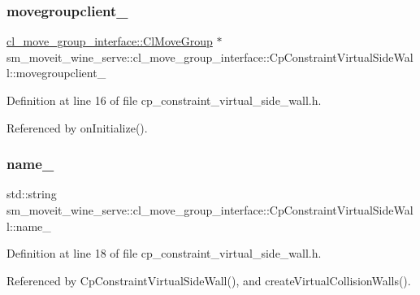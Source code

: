 \subsubsection{\texorpdfstring{movegroupclient\+\_\+}{movegroupclient\_}}
{\footnotesize\ttfamily \hyperlink{classcl__move__group__interface_1_1ClMoveGroup}{cl\+\_\+move\+\_\+group\+\_\+interface\+::\+Cl\+Move\+Group} $\ast$ sm\+\_\+moveit\+\_\+wine\+\_\+serve\+::cl\+\_\+move\+\_\+group\+\_\+interface\+::\+Cp\+Constraint\+Virtual\+Side\+Wall\+::movegroupclient\+\_\+\hspace{0.3cm}{\ttfamily [private]}}



Definition at line 16 of file cp\+\_\+constraint\+\_\+virtual\+\_\+side\+\_\+wall.\+h.



Referenced by on\+Initialize().

\mbox{\label{classsm__moveit__wine__serve_1_1cl__move__group__interface_1_1CpConstraintVirtualSideWall_abe1e7ae9ca5d54953ffaaa8d85ff16ac}} 
\subsubsection{\texorpdfstring{name\+\_\+}{name\_}}
{\footnotesize\ttfamily std\+::string sm\+\_\+moveit\+\_\+wine\+\_\+serve\+::cl\+\_\+move\+\_\+group\+\_\+interface\+::\+Cp\+Constraint\+Virtual\+Side\+Wall\+::name\+\_\+\hspace{0.3cm}{\ttfamily [private]}}



Definition at line 18 of file cp\+\_\+constraint\+\_\+virtual\+\_\+side\+\_\+wall.\+h.



Referenced by Cp\+Constraint\+Virtual\+Side\+Wall(), and create\+Virtual\+Collision\+Walls().

